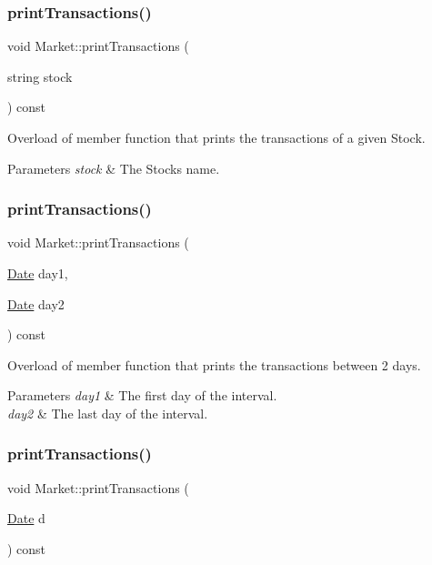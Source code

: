 \subsubsection{\texorpdfstring{print\+Transactions()}{printTransactions()}\hspace{0.1cm}{\footnotesize\ttfamily [2/4]}}
{\footnotesize\ttfamily void Market\+::print\+Transactions (\begin{DoxyParamCaption}\item[{string}]{stock }\end{DoxyParamCaption}) const}

Overload of member function that prints the transactions of a given Stock. 
\begin{DoxyParams}{Parameters}
{\em stock} & The Stock\textquotesingle{}s name. \\
\hline
\end{DoxyParams}
\mbox{\label{class_market_af8fb6cab3b4c492d753629be2ff82849}} 
\subsubsection{\texorpdfstring{print\+Transactions()}{printTransactions()}\hspace{0.1cm}{\footnotesize\ttfamily [3/4]}}
{\footnotesize\ttfamily void Market\+::print\+Transactions (\begin{DoxyParamCaption}\item[{\hyperlink{class_date}{Date}}]{day1,  }\item[{\hyperlink{class_date}{Date}}]{day2 }\end{DoxyParamCaption}) const}

Overload of member function that prints the transactions between 2 days. 
\begin{DoxyParams}{Parameters}
{\em day1} & The first day of the interval. \\
\hline
{\em day2} & The last day of the interval. \\
\hline
\end{DoxyParams}
\mbox{\label{class_market_af24b2823a9bd733720dbeb8ec9627e3d}} 
\subsubsection{\texorpdfstring{print\+Transactions()}{printTransactions()}\hspace{0.1cm}{\footnotesize\ttfamily [4/4]}}
{\footnotesize\ttfamily void Market\+::print\+Transactions (\begin{DoxyParamCaption}\item[{\hyperlink{class_date}{Date}}]{d }\end{DoxyParamCaption}) const}

